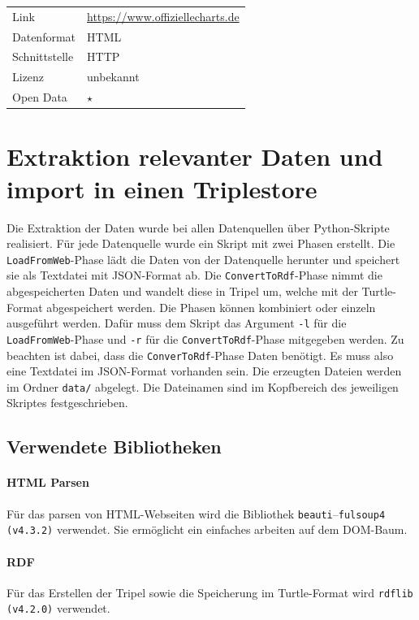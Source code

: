 \documentclass[parskip]{scrartcl}
\begin{document}
\begin{tabular}{l|p{9cm}}
    Link & \url{https://www.offiziellecharts.de} \\
    Datenformat & HTML \\
    Schnittstelle & HTTP \\
    Lizenz & unbekannt \\
    Open Data & $\star$ \\
\end{tabular}

\section{Extraktion relevanter Daten und import in einen Triplestore }

Die Extraktion der Daten wurde bei allen Datenquellen über Python-Skripte realisiert. Für jede Datenquelle wurde ein Skript mit zwei Phasen erstellt. Die \texttt{LoadFromWeb}-Phase lädt die Daten von der Datenquelle herunter und speichert sie als Textdatei mit JSON-Format ab. Die \texttt{ConvertToRdf}-Phase nimmt die abgespeicherten Daten und wandelt diese in Tripel um, welche mit der Turtle-Format abgespeichert werden. Die Phasen können kombiniert oder einzeln ausgeführt werden. Dafür muss dem Skript das Argument \texttt{-l} für die \texttt{LoadFromWeb}-Phase und \texttt{-r} für die \texttt{ConvertToRdf}-Phase mitgegeben werden. Zu beachten ist dabei, dass die \texttt{ConverToRdf}-Phase Daten benötigt. Es muss also eine Textdatei im JSON-Format vorhanden sein.
Die erzeugten Dateien werden im Ordner \texttt{data/} abgelegt. Die Dateinamen sind im Kopfbereich des jeweiligen Skriptes festgeschrieben.


\subsection{Verwendete Bibliotheken}

\paragraph{HTML Parsen}
Für das parsen von HTML-Webseiten wird die Bibliothek \texttt{beauti}--\texttt{fulsoup4  (v4.3.2)} verwendet. Sie ermöglicht ein einfaches arbeiten auf dem DOM-Baum.

\paragraph{RDF}
Für das Erstellen der Tripel sowie die Speicherung im Turtle-Format wird \texttt{rdflib (v4.2.0)} verwendet. 
\end{document}
